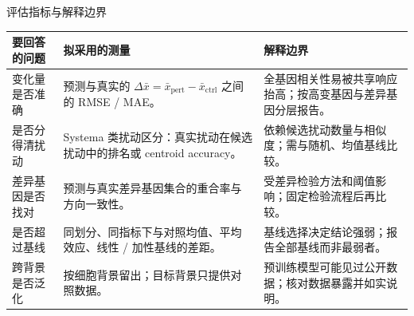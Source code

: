 \begin{frame}[t]{评估指标与解释边界}
\vspace{.15cm}
\fontsize{8.7}{12}\selectfont\renewcommand{\arraystretch}{1.16}
\begin{tabularx}{\textwidth}{@{}P{2.35cm}Y Y@{}}
\toprule\textbf{要回答的问题}&\textbf{拟采用的测量}&\textbf{解释边界}\\\midrule
变化量是否准确 & 预测与真实的 $\Delta\bar{x}=\bar{x}_{\mathrm{pert}}-\bar{x}_{\mathrm{ctrl}}$ 之间的 RMSE / MAE。 & 全基因相关性易被共享响应抬高；按高变基因与差异基因分层报告。\\
是否分得清扰动 & Systema 类扰动区分：真实扰动在候选扰动中的排名或 centroid accuracy。 & 依赖候选扰动数量与相似度；需与随机、均值基线比较。\\
差异基因是否找对 & 预测与真实差异基因集合的重合率与方向一致性。 & 受差异检验方法和阈值影响；固定检验流程后再比较。\\
是否超过基线 & 同划分、同指标下与对照均值、平均效应、线性 / 加性基线的差距。 & 基线选择决定结论强弱；报告全部基线而非最弱者。\\
跨背景是否泛化 & 按细胞背景留出；目标背景只提供对照数据。 & 预训练模型可能见过公开数据；核对数据暴露并如实说明。\\\bottomrule
\end{tabularx}
\end{frame}

